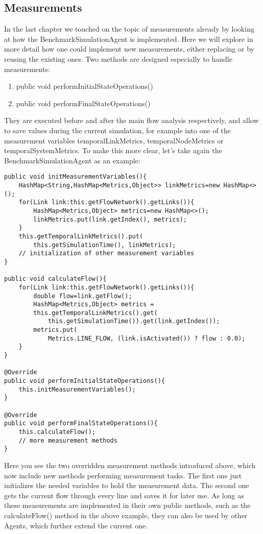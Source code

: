 \documentclass[11pt,fleqn]{book} %
\newcommand{\BenchmarkAgent}{BenchmarkSimulationAgent}
\begin{document}
\subsection{Measurements}
In the last chapter we touched on the topic of measurements already by looking at how the \BenchmarkAgent{} is implemented. Here we will explore in more detail how one could implement new measurements, either replacing or by reusing the existing ones. 
Two methods are designed especially to handle measurements:
\begin{enumerate}
	\item public void performInitialStateOperations()
	\item public void performFinalStateOperations()
\end{enumerate}
They are executed before and after the main flow analysis respectively, and allow to save values during the current simulation, for example into one of the measurement variables temporalLinkMetrics, temporalNodeMetrics or temporalSystemMetrics.
To make this more clear, let’s take again the \BenchmarkAgent{} as an example:
\begin{lstlisting}[frame=single]
public void initMeasurementVariables(){
    HashMap<String,HashMap<Metrics,Object>> linkMetrics=new HashMap<>();
    for(Link link:this.getFlowNetwork().getLinks()){
        HashMap<Metrics,Object> metrics=new HashMap<>();
        linkMetrics.put(link.getIndex(), metrics);
    }
    this.getTemporalLinkMetrics().put(
    	this.getSimulationTime(), linkMetrics);
    // initialization of other measurement variables
}        

public void calculateFlow(){
    for(Link link:this.getFlowNetwork().getLinks()){
        double flow=link.getFlow();
        HashMap<Metrics,Object> metrics = 
        this.getTemporalLinkMetrics().get(
        	this.getSimulationTime()).get(link.getIndex());
        metrics.put(
        	Metrics.LINE_FLOW, (link.isActivated()) ? flow : 0.0);
    }
}

@Override
public void performInitialStateOperations(){
    this.initMeasurementVariables();
}
    
@Override
public void performFinalStateOperations(){
    this.calculateFlow();
    // more measurement methods
}
\end{lstlisting}

Here you see the two overridden measurement methods introduced above, which now include new methods performing measurement tasks. The first one just initializes the needed variables to hold the measurement data. The second one gets the current flow through every line and saves it for later use. As long as these measurements are implemented in their own public methods, such as the calculateFlow() method in the above example, they can also be used by other Agents, which further extend the current one.
\end{document}
